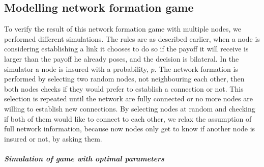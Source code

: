 \subsection{Modelling network formation game}
To verify the result of this network formation game with multiple nodes, we performed different simulations.  The rules are as described earlier, when a node is considering establishing a link it chooses to do so if the payoff it will receive is larger than the payoff he already poses, and the decision is bilateral. 
In the simulator a node is insured with a probability, $p$. The network formation is performed by selecting two random nodes, not neighbouring each other, then both nodes checks if they would prefer to establish a connection or not. This selection is repeated until the network are fully connected or no more nodes are willing to establish new connections.
By selecting nodes at random and checking if both of them would like to connect to each other, we relax the assumption of full network information, because now nodes only get to know if another node is insured or not, by asking them.
\subparagraph{Simulation of game with optimal parameters}
